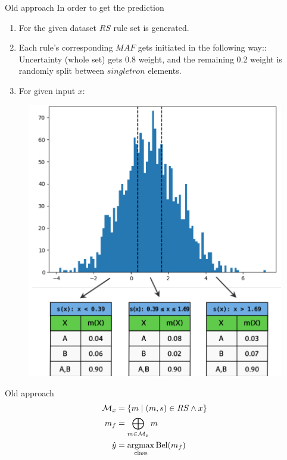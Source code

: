 \documentclass[aspectratio=169]{beamer}
\begin{document}
\begin{frame}{Old approach}
    In order to get the prediction
\begin{enumerate}
    \item For the given dataset $RS$ rule set is generated.
    \item Each rule's corresponding $MAF$ gets initiated in the following way:: Uncertainty (whole set) gets 0.8 weight, and the remaining 0.2 weight is randomly split between $singletron$ elements.
    \item For given input $x$:
\end{enumerate}

\end{frame}

\begin{frame}
\begin{figure}
    \centering
    \includegraphics[width=0.45\linewidth]{image.png}
    \label{fig:enter-label}
\end{figure}
    
\end{frame}



\begin{frame}{Old approach}
\begin{align*}
\mathcal{M}_x &= \left\{ m \mid (m, s) \in RS \land x \right\} \\
m_f &= \bigoplus_{m \in \mathcal{M}_x} m \\
\hat{y} &= \underset{{\rm class}}{\mathrm{argmax}} \, {\rm Bel}(m_f)
\end{align*}

\end{frame}

\end{document}
